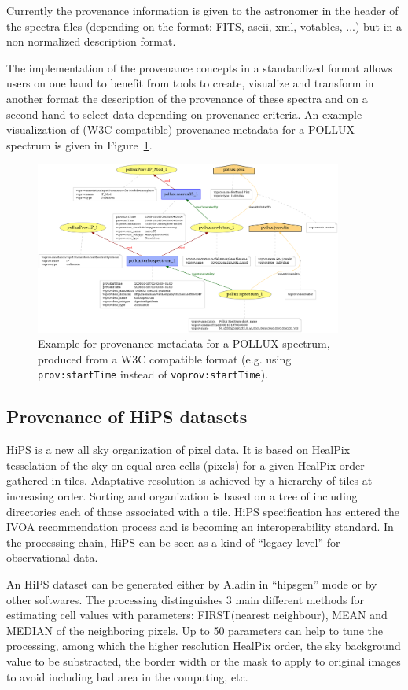 Currently the provenance information is given to the astronomer in the header of the spectra files (depending on the format: FITS, ascii, xml, votables, ...) but in a non normalized description format. 

The implementation of the provenance concepts in a standardized format allows users on one hand to benefit from tools to create, visualize and transform in another format the description of the provenance of these spectra and on a second hand to select data depending on provenance criteria. An example visualization of (W3C compatible) provenance metadata for a POLLUX spectrum is given in Figure~\ref{fig:pollux}.

\begin{figure}
\centering
\includegraphics[width=0.9\textwidth]{usecase_Pollux_example1.png}
\caption{Example for provenance metadata for a POLLUX spectrum, produced from a W3C compatible format (e.g. using \texttt{prov:startTime} instead of \texttt{voprov:startTime}).}
\label{fig:pollux}
\end{figure}

\subsection{Provenance of HiPS datasets}
HiPS is a new all sky organization of pixel data. It is based on HealPix tesselation of the sky on equal area cells (pixels) for a given HealPix order gathered in tiles. Adaptative resolution is achieved by a hierarchy of tiles at increasing order. Sorting and organization is based on a tree of including directories each of those associated with a tile. HiPS specification has entered the IVOA recommendation process and is becoming an interoperability standard.
In the processing chain, HiPS can be seen as a kind of ``legacy level'' for observational data.


An HiPS dataset can be generated either by Aladin in ``hipsgen'' mode or by other softwares.
The processing distinguishes 3 main different methods for estimating cell values with parameters: FIRST(nearest neighbour), MEAN and MEDIAN of the neighboring pixels. Up to 50 parameters can help to tune the processing, among which the higher resolution HealPix order, the sky background value to be substracted, the border width or the mask to apply to original images to avoid including bad area in the computing, etc.


